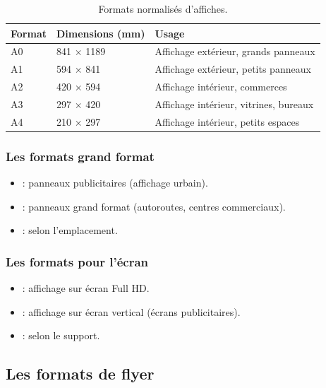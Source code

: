 \begin{table}[h!]
\centering
\begin{tabular}{@{}lll@{}}
\toprule
\textbf{Format} & \textbf{Dimensions (mm)} & \textbf{Usage} \\
\midrule
A0 & 841 × 1189 & Affichage extérieur, grands panneaux \\
A1 & 594 × 841 & Affichage extérieur, petits panneaux \\
A2 & 420 × 594 & Affichage intérieur, commerces \\
A3 & 297 × 420 & Affichage intérieur, vitrines, bureaux \\
A4 & 210 × 297 & Affichage intérieur, petits espaces \\
\bottomrule
\end{tabular}
\caption{Formats normalisés d'affiches.}
\end{table}

\subsubsection{Les formats grand format}

\begin{itemize}
    \item {} : panneaux publicitaires (affichage urbain).
    \item {} : panneaux grand format (autoroutes, centres commerciaux).
    \item {} : selon l'emplacement.
\end{itemize}

\subsubsection{Les formats pour l'écran}

\begin{itemize}
    \item {} : affichage sur écran Full HD.
    \item {} : affichage sur écran vertical (écrans publicitaires).
    \item {} : selon le support.
\end{itemize}

\subsection{Les formats de flyer}

